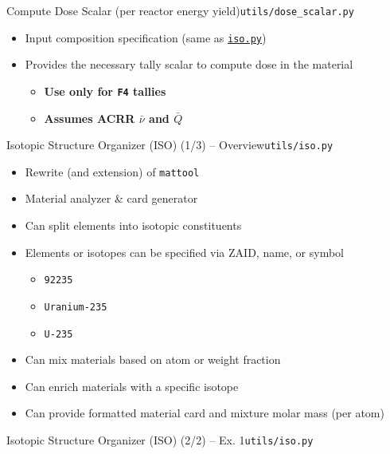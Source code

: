\documentclass[aspectratio=169]{beamer}
\begin{document}
\begin{frame}{Compute Dose Scalar (per reactor energy yield)}{\lstinline{utils/dose_scalar.py}}\label{dose-scalar}
  \begin{itemize}
    \item{Input composition specification (same as \hyperlink{iso}{\lstinline{iso.py}})}
    \item{
      Provides the necessary tally scalar to compute dose in the material
      \begin{itemize}
        \item{\textbf{Use only for \lstinline{F4} tallies}}
        \item{\textbf{Assumes ACRR $\bar{\nu}$ and $\bar{Q}$}}
      \end{itemize}
    }
  \end{itemize}
  \begin{example}
    
  \end{example}
\end{frame}

\begin{frame}{Isotopic Structure Organizer (ISO) (1/3) -- Overview}{\lstinline{utils/iso.py}}\label{iso}
  \begin{itemize}
    \item{Rewrite (and extension) of \lstinline{mattool}}
    \item{Material analyzer \& card generator}
    \item{Can split elements into isotopic constituents}
    \item{
      Elements or isotopes can be specified via ZAID, name, or symbol
      \begin{itemize}
        \item{\lstinline{92235}}
        \item{\lstinline{Uranium-235}}
        \item{\lstinline{U-235}}
      \end{itemize}
    }
    \item{Can mix materials based on atom or weight fraction}
    \item{Can enrich materials with a specific isotope}
    \item{Can provide formatted material card and mixture molar mass (per atom)}
  \end{itemize}
\end{frame}

\begin{frame}{Isotopic Structure Organizer (ISO) (2/2) -- Ex. 1}{\lstinline{utils/iso.py}}
  \begin{example}[Water]
    
  \end{example}
\end{frame}
\end{document}
